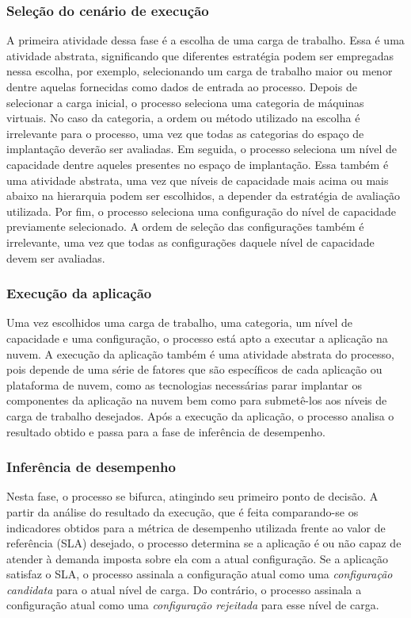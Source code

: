\documentclass[12pt]{article}
\begin{document}
\subsubsection{Seleção do cenário de execução}

A primeira atividade dessa fase é a escolha de uma carga de trabalho. Essa é uma atividade abstrata, significando que diferentes estratégia podem ser empregadas nessa escolha, por exemplo, selecionando um carga de trabalho maior ou menor dentre aquelas fornecidas como dados de entrada ao processo. Depois de selecionar a carga inicial, o processo seleciona uma categoria de máquinas virtuais. No caso da categoria, a ordem ou método utilizado na escolha é irrelevante para o processo, uma vez que todas as categorias do espaço de implantação deverão ser avaliadas. Em seguida, o processo seleciona um nível de capacidade dentre aqueles presentes no espaço de implantação. Essa também é uma atividade abstrata, uma vez que níveis de capacidade mais acima ou mais abaixo na hierarquia podem ser escolhidos, a depender da estratégia de avaliação utilizada. Por fim, o processo seleciona uma configuração do nível de capacidade previamente selecionado. A ordem de seleção das configurações também é irrelevante, uma vez que todas as 
configurações daquele nível de capacidade devem ser avaliadas. 

\subsubsection{Execução da aplicação}

Uma vez escolhidos uma carga de trabalho, uma categoria, um nível de capacidade e uma configuração, o processo está apto a executar a aplicação na nuvem. A execução da aplicação também é uma atividade abstrata do processo, pois depende de uma série de fatores que são específicos de cada aplicação ou plataforma de nuvem, como as tecnologias necessárias parar implantar os componentes da aplicação na nuvem bem como para submetê-los aos níveis de carga de trabalho desejados.  Após a execução da aplicação, o processo analisa o resultado obtido e passa para a fase de inferência de desempenho.

\subsubsection{Inferência de desempenho}

Nesta fase, o processo se bifurca, atingindo seu primeiro ponto de decisão. A partir da análise do resultado da execução, que é feita comparando-se os indicadores obtidos para a métrica de desempenho utilizada frente ao valor de referência (SLA) desejado, o processo determina se a aplicação é ou não capaz de atender à demanda imposta sobre ela com a atual configuração. Se a aplicação satisfaz o SLA, o processo assinala a configuração atual como uma {\em configuração candidata} para o atual nível de carga. Do contrário, o processo assinala a configuração atual como uma {\em configuração rejeitada} para esse nível de carga.
\end{document}
